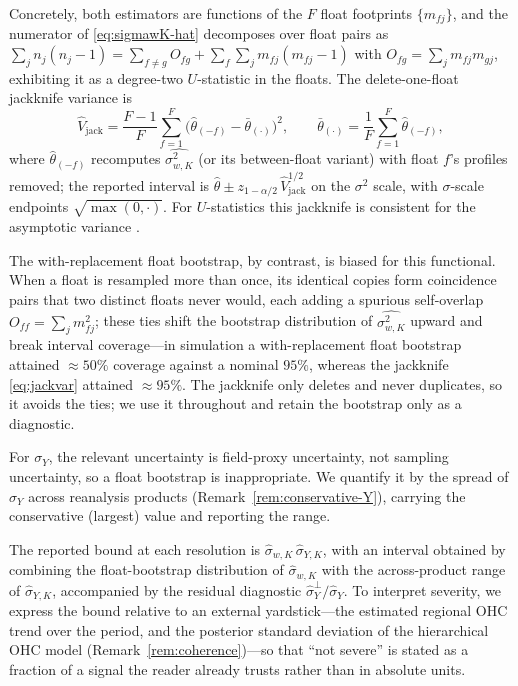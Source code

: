 Concretely, both estimators are functions of the $F$ float footprints
$\{m_{fj}\}$, and the numerator of \eqref{eq:sigmawK-hat} decomposes over
float pairs as
$\sum_j n_j(n_j-1)=\sum_{f\ne g}O_{fg}+\sum_f\sum_j m_{fj}(m_{fj}-1)$ with
$O_{fg}=\sum_j m_{fj}m_{gj}$, exhibiting it as a degree-two $U$-statistic
in the floats. The delete-one-float jackknife variance is
\begin{equation}
  \widehat V_{\mathrm{jack}}
  =\frac{F-1}{F}\sum_{f=1}^{F}\big(\hat\theta_{(-f)}-\bar\theta_{(\cdot)}\big)^2,
  \qquad \bar\theta_{(\cdot)}=\frac1F\sum_{f=1}^{F}\hat\theta_{(-f)},
  \label{eq:jackvar}
\end{equation}
where $\hat\theta_{(-f)}$ recomputes $\widehat{\sigma_{w,K}^2}$ (or its
between-float variant) with float $f$'s profiles removed; the reported
interval is $\hat\theta\pm z_{1-\alpha/2}\,\widehat V_{\mathrm{jack}}^{1/2}$
on the $\sigma^2$ scale, with $\sigma$-scale endpoints
$\sqrt{\max(0,\cdot)}$. For $U$-statistics this jackknife is consistent
for the asymptotic variance \citep{arvesen1969}.

The with-replacement float bootstrap, by contrast, is biased for this
functional. When a float is resampled more than once, its identical
copies form coincidence pairs that two distinct floats never would, each
adding a spurious self-overlap $O_{ff}=\sum_j m_{fj}^2$; these ties shift
the bootstrap distribution of $\widehat{\sigma_{w,K}^2}$ upward and break
interval coverage---in simulation a with-replacement float bootstrap
attained $\approx 50\%$ coverage against a nominal $95\%$, whereas the
jackknife \eqref{eq:jackvar} attained $\approx 95\%$. The jackknife only
deletes and never duplicates, so it avoids the ties; we use it
throughout and retain the bootstrap only as a diagnostic.

For $\sigma_Y$, the relevant uncertainty is field-proxy uncertainty,
not sampling uncertainty, so a float bootstrap is inappropriate. We
quantify it by the spread of $\hat\sigma_Y$ across reanalysis products
(Remark~\ref{rem:conservative-Y}), carrying the conservative (largest)
value and reporting the range.

The reported bound at each resolution is
$\hat\sigma_{w,K}\,\hat\sigma_{Y,K}$, with an interval obtained by
combining the float-bootstrap distribution of $\hat\sigma_{w,K}$ with
the across-product range of $\hat\sigma_{Y,K}$, accompanied by the
residual diagnostic $\hat\sigma_Y^{\perp}/\hat\sigma_Y$. To interpret
severity, we express the bound relative to an external yardstick---the
estimated regional OHC trend over the period, and the posterior
standard deviation of the hierarchical OHC model
(Remark~\ref{rem:coherence})---so that ``not severe'' is stated as a
fraction of a signal the reader already trusts rather than in absolute
units.

